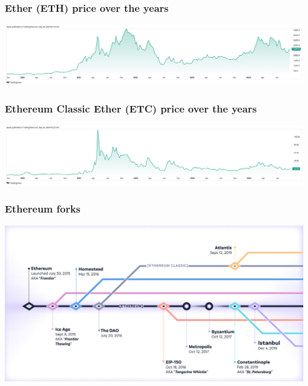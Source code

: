 \documentclass[11pt]{beamer}  %
\begin{document}
\begin{frame}\frametitle{Ether (ETH) price over the years}

  \begin{center}
    \includegraphics[scale=0.185,clip=false]{pictures/ether-chart.png}
  \end{center}

\end{frame}

\begin{frame}\frametitle{Ethereum Classic Ether (ETC) price over the years}

  \begin{center}
    \includegraphics[scale=0.185,clip=false]{pictures/ether-classic-chart.png}
  \end{center}

\end{frame}

\begin{frame}\frametitle{Ethereum forks}

  \begin{center}
    \includegraphics[width=\textwidth,clip=false]{pictures/ethereum-forks.jpg}
  \end{center}

\end{frame}
\end{document}
